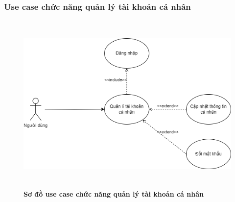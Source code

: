 \subsubsection{Use case chức năng quản lý tài khoản cá nhân}
  \begin{figure}[H]
    \centering
    \includegraphics[width=14.8cm,height=9cm]{Images/use_case/use_case_manage_info.png}
    \caption[Sơ đồ use case chức năng quản lý tài khoản cá nhân]{\bfseries \fontsize{12pt}{0pt}
    \selectfont Sơ đồ use case chức năng quản lý tài khoản cá nhân}
    \label{use_case_manage_info} %
  \end{figure}

